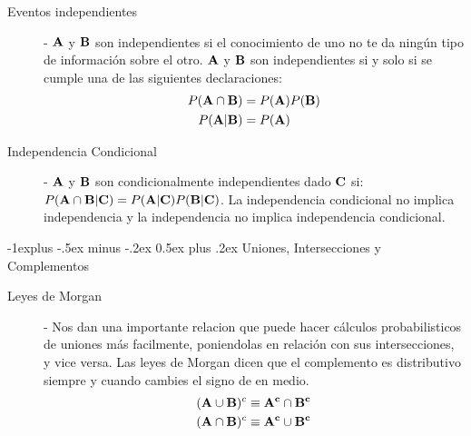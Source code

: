 \documentclass[10pt,landscape]{article}
\makeatletter
\renewcommand{\subsection}{\@startsection{subsection}{2}{0mm}%
                                {-1explus -.5ex minus -.2ex}%
                                {0.5ex plus .2ex}%
                                {\normalfont\normalsize\bfseries}}
\makeatother
\begin{document}
\begin{multicols}{3}
    \begin{description}
        \item[Eventos independientes] - ${\bf A}$ y ${\bf B}$ son independientes si el conocimiento de uno no te da ningún tipo de información sobre el otro. ${\bf A}$ y ${\bf B}$ son independientes si y solo si se cumple una de las siguientes declaraciones: 
           \begin{align*} 
            P({\bf A}\cap {\bf B}) &= P({\bf A})P({\bf B}) \\
            P({\bf A}|{\bf B}) &= P({\bf A})
           \end{align*}
        \item[Independencia Condicional] - ${\bf A}$ y ${\bf B}$ son condicionalmente independientes dado ${\bf C}$ si: $P({\bf A}\cap {\bf B}|{\bf C}) = P({\bf A}|{\bf C})P({\bf B}|{\bf C})$. La independencia condicional no implica independencia y la independencia no implica independencia condicional. 
    \end{description}
    
\subsection{Uniones, Intersecciones y Complementos}

    \begin{description}

        \item[Leyes de Morgan] - Nos dan una importante relacion que puede hacer cálculos probabilisticos de uniones más facilmente, poniendolas en relación con sus intersecciones, y vice versa. Las leyes de Morgan dicen que el complemento es distributivo siempre y cuando cambies el signo de en medio.
           \begin{align*} 
        ({\bf A} \cup {\bf B})^c \equiv {\bf A^c} \cap {\bf B^c} \\
        ({\bf A} \cap {\bf B})^c \equiv {\bf A^c} \cup {\bf B^c}
           \end{align*} 
                  


\end{description}
\end{multicols}
\end{document}

